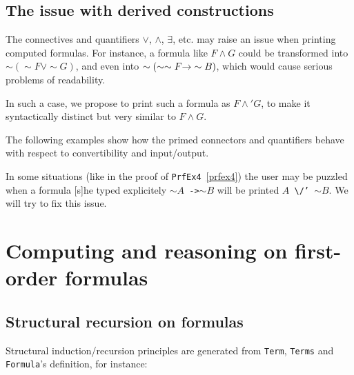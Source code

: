 

\subsection{The issue with derived constructions}
\label{sect:fol-issue}


The connectives and quantifiers $\vee$, $\wedge$, $\exists$, etc. may raise an issue when printing computed formulas.
For instance, a formula like $F \wedge G$ could be transformed into $\sim(\sim F \vee \sim G)$,  and even
into $\sim(\sim\sim F \mbox{$\rightarrow$} \sim B)$, which would 
cause serious problems of readability.

In such a case, we propose to print such a formula as $F \wedge' G$, to make it syntactically distinct but very similar to $F \wedge G$.


The following examples show how the primed connectors 
and quantifiers behave with respect to convertibility and 
input/output.






\begin{remark}
In some situations (like in the proof of \texttt{PrfEx4}~\vref{prfex4})
the user may be puzzled when a formula [s]he typed explicitely
\texttt{$\sim A$ ->$\sim B$}  will be printed 
\texttt{$A$  \textbackslash/' $\sim B$}. We will try to fix this issue.
\end{remark}








\section{Computing and reasoning on first-order formulas}


\subsection{Structural recursion on formulas}

Structural induction/recursion principles are generated from
\texttt{Term}, \texttt{Terms} and \texttt{Formula}'s definition, for instance:


